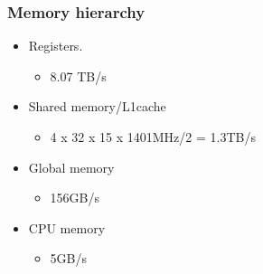 \documentclass{beamer}
\begin{document}
\begin{frame}
\frametitle{Memory hierarchy}
\begin{itemize}
\item Registers. 
\begin{itemize}
\item 8.07 TB/s 
\end{itemize}
\item Shared memory/L1cache
\begin{itemize}
\item 4 x 32 x 15 x 1401MHz/2 = 1.3TB/s
\end{itemize}
\item Global memory
\begin{itemize}
\item 156GB/s
\end{itemize}
\item CPU memory
\begin{itemize}
\item 5GB/s
\end{itemize}
\end{itemize}

\end{frame}
\end{document}
